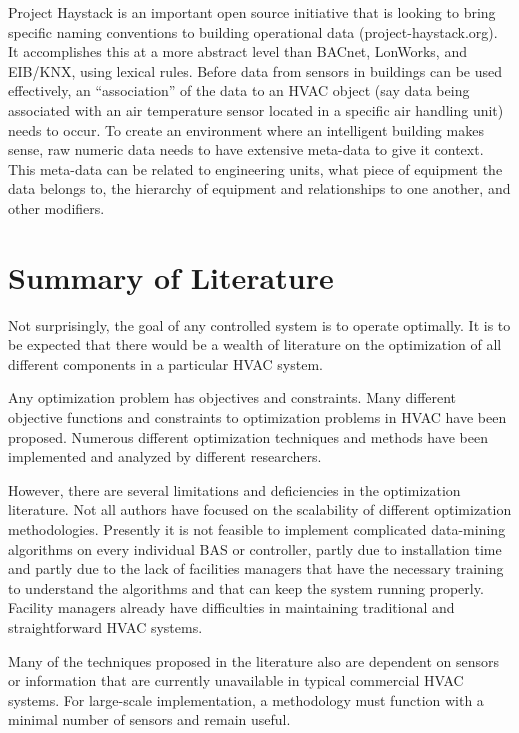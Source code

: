 Project Haystack is an important open source initiative that is looking
to bring specific naming conventions to building operational data
(project-haystack.org). It accomplishes this at a more abstract level
than BACnet, LonWorks, and EIB/KNX, using lexical rules. Before data
from sensors in buildings can be used effectively, an ``association'' of
the data to an HVAC object (say data being associated with an air
temperature sensor located in a specific air handling unit) needs to
occur. To create an environment where an intelligent building makes
sense, raw numeric data needs to have extensive meta-data to give it
context. This meta-data can be related to engineering units, what piece
of equipment the data belongs to, the hierarchy of equipment and
relationships to one another, and other modifiers. 



\section{Summary of Literature}

Not surprisingly, the goal of any controlled system is to operate
optimally. It is to be expected that there would be a wealth of
literature on the optimization of all different components in a
particular HVAC system. 

Any optimization problem has objectives and constraints. Many different
objective functions and constraints to optimization problems in HVAC
have been proposed. Numerous different optimization techniques and
methods have been implemented and analyzed by different researchers. 

However, there are several limitations and deficiencies in the
optimization literature. Not all authors have focused on the scalability
of different optimization methodologies. Presently it is not feasible to
implement complicated data-mining algorithms on every individual BAS or
controller, partly due to installation time and partly due to the lack
of facilities managers that have the necessary training to understand
the algorithms and that can keep the system running properly. Facility
managers already have difficulties in maintaining traditional and
straightforward HVAC systems. 

Many of the techniques proposed in the literature also are dependent on
sensors or information that are currently unavailable in typical
commercial HVAC systems. For large-scale implementation, a methodology
must function with a minimal number of sensors and remain useful.

